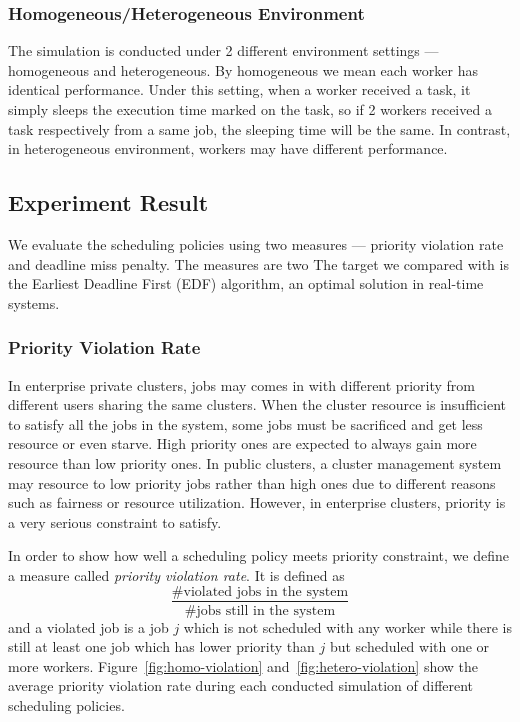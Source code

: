 \subsubsection{Homogeneous/Heterogeneous Environment}

The simulation is conducted under 2 different environment settings ---
homogeneous and heterogeneous.
By homogeneous we mean each worker has identical performance.
Under this setting, when a worker received a task, it simply sleeps the
execution time marked on the task, so if 2 workers received a task
respectively from a same job, the sleeping time will be the same.
In contrast, in heterogeneous environment, workers may have different
performance.

\subsection{Experiment Result}

We evaluate the scheduling policies using two measures --- priority
violation rate and deadline miss penalty.
The measures are two
The target we compared with is the Earliest Deadline First (EDF)
algorithm, an optimal solution in real-time systems.

\subsubsection{Priority Violation Rate}

In enterprise private clusters, jobs may comes in with different
priority from different users sharing the same clusters.
When the cluster resource is insufficient to satisfy all the jobs in the
system, some jobs must be sacrificed and get less resource or even
starve.
High priority ones are expected to always gain more resource than low
priority ones.
In public clusters, a cluster management system may resource to low
priority jobs rather than high ones due to different reasons such as
fairness or resource utilization.
However, in enterprise clusters, priority is a very serious constraint
to satisfy.

In order to show how well a scheduling policy meets priority constraint,
we define a measure called \emph{priority violation rate}.
It is defined as $$\frac{\textrm{\#violated jobs in the
system}}{\textrm{\#jobs still in the system}}$$ and a violated job is a
job $j$ which is not scheduled with any worker while there is still at
least one job which has lower priority than $j$ but scheduled with one
or more workers.
Figure~\ref{fig:homo-violation} and~\ref{fig:hetero-violation} show the
average priority violation rate during each conducted simulation of
different scheduling policies.

